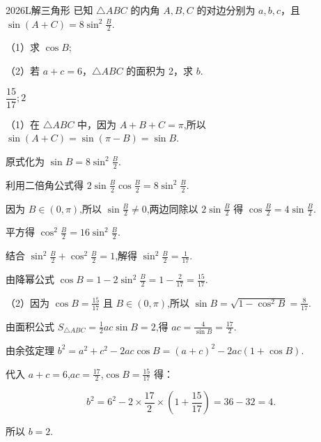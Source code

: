 \documentclass[12pt,UTF-8,a4paper]{ctexart}
\numberwithin{figure}{section}
\theoremstyle{mystyle}
\theoremstyle{mystylekaishu}
\theoremstyle{mystyle}
\numberwithin{xiti}{section}
\begin{document}

\begin{problem}{2026}{L}{}{}{解三角形}
已知 $\triangle ABC$ 的内角 $A, B, C$ 的对边分别为 $a, b, c$，且 $\sin(A+C)=8\sin^2\frac{B}{2}$.

（1）求 $\cos B$;

（2）若 $a+c=6$，$\triangle ABC$ 的面积为 2，求 $b$.
\end{problem}

\begin{answer}
$\displaystyle\dfrac{15}{17}; 2$
\end{answer}

\begin{solutions}
（1）在 $\triangle ABC$ 中，因为 $A+B+C=\pi$,所以 $\sin(A+C)=\sin(\pi-B)=\sin B$.

原式化为 $\sin B=8\sin^2\frac{B}{2}$.

利用二倍角公式得 $2\sin\frac{B}{2}\cos\frac{B}{2}=8\sin^2\frac{B}{2}$.

因为 $B\in(0,\pi)$,所以 $\sin\frac{B}{2}\neq 0$,两边同除以 $2\sin\frac{B}{2}$ 得 $\cos\frac{B}{2}=4\sin\frac{B}{2}$.

平方得 $\cos^2\frac{B}{2}=16\sin^2\frac{B}{2}$.

结合 $\sin^2\frac{B}{2}+\cos^2\frac{B}{2}=1$,解得 $\sin^2\frac{B}{2}=\displaystyle\frac{1}{17}$.

由降幂公式 $\cos B=1-2\sin^2\frac{B}{2}=1-\displaystyle\frac{2}{17}=\displaystyle\frac{15}{17}$.

（2）因为 $\cos B=\displaystyle\frac{15}{17}$ 且 $B\in(0,\pi)$,所以 $\sin B=\sqrt{1-\cos^2 B}=\displaystyle\frac{8}{17}$.

由面积公式 $S_{\triangle ABC}=\displaystyle\frac{1}{2}ac\sin B=2$,得 $ac=\displaystyle\frac{4}{\sin B}=\displaystyle\frac{17}{2}$.

由余弦定理 $b^2=a^2+c^2-2ac\cos B=(a+c)^2-2ac(1+\cos B)$.

代入 $a+c=6$,$ac=\displaystyle\frac{17}{2}$,$\cos B=\displaystyle\frac{15}{17}$ 得：

$$
b^2=6^2-2\times\displaystyle\frac{17}{2}\times\left(1+\displaystyle\frac{15}{17}\right)=36-32=4.
$$

所以 $b=\boxed{2}$.
\end{solutions}

\end{document}
